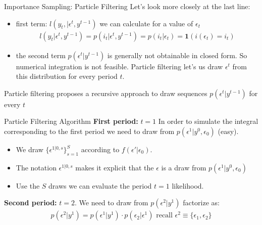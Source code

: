 \begin{frame}{Importance Sampling: Particle Filtering}
Let's look more closely at the last line:
\begin{itemize}
\item first term: $l(y_t, | \epsilon^t,y^{t-1})$ we can calculate for a value of $\epsilon_t$
\begin{eqnarray*}
l(y_t | \epsilon^t , y^{t-1}) = p(i_t | \epsilon^t, y^{t-1}) = p(i_t | \epsilon_t) = \mathbf{1}(i(\epsilon_t) = i_t)
\end{eqnarray*}
\item the second term $p(\epsilon^t | y^{t-1})$ is generally not obtainable in closed form. So numerical integration is not feasible. Particle filtering let's us draw $\epsilon^t$ from this distribution for every period $t$.
\end{itemize}
Particle filtering proposes a recursive approach to draw sequences $p(\epsilon^t | y^{t-1})$ for every $t$
\end{frame}


\begin{frame}{Particle Filtering Algorithm}
\textbf{First period:} $t=1$ In order to simulate the integral corresponding to the first period we need to draw from $p(\epsilon^1 | y^0,\epsilon_0)$ (easy).  
\begin{itemize}
\item We draw $\{\epsilon^{1|0,s }\}_{s=1}^S$ according to $f(\epsilon' | \epsilon_0)$.
\item The notation $\epsilon^{1|0,s}$ makes it explicit that the $\epsilon$ is a draw from $p(\epsilon^1 | y^0,\epsilon_0)$
\item Use the $S$ draws we can evaluate the period $t=1$ likelihood.
\end{itemize}
\textbf{Second period:} $t=2$. We need to draw from $p(\epsilon^2 | y^1)$ factorize as:
\begin{eqnarray*}
p(\epsilon^2 | y^1) = p(\epsilon^1 | y^1) \cdot p(\epsilon_2 | \epsilon^1) \mbox{ recall } \epsilon^2 \equiv \{\epsilon_1,\epsilon_2\}
\end{eqnarray*}
\end{frame}

